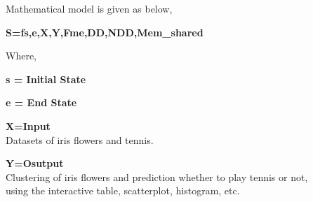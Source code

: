 \documentclass[10pt,a4paper]{article}
\begin{document}
{\rmfamily
	Mathematical model is given as below,}


\bigskip

\textrm{\textbf{S=fs,e,X,Y,Fme,DD,NDD,Mem\_shared}}


\bigskip

{\rmfamily
	Where,}

{\rmfamily
	\textbf{s = Initial State}}

{\rmfamily
	\textbf{e = End State}}

{\rmfamily
	\textbf{X=Input}\\
	Datasets of iris flowers and tennis.
	}
	
	{\rmfamily
		\textbf{Y=Osutput}\\
		Clustering of iris flowers and prediction whether to play tennis or not, \\using the interactive table, scatterplot, histogram, etc.}
	
\end{document}
